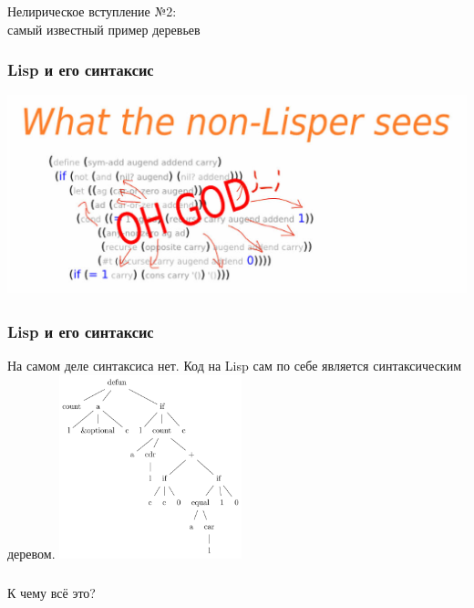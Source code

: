 \documentclass[10pt]{beamer}
\begin{document}
    \begin{frame}[c]
        \frametitle{}
        \LARGE\begin{center}
            {\color{darkred} Нелирическое вступление №2:\\самый известный пример деревьев}
        \end{center}
    \end{frame}

    \begin{frame}
        \frametitle{Lisp и его синтаксис}
        \begin{block}{}\includegraphics[width=\textwidth]{assets/lispomg.jpg}\end{block}
    \end{frame}

    \begin{frame}
        \frametitle{Lisp и его синтаксис}
        \begin{multicols}{2}
            На самом деле синтаксиса нет. Код на Lisp сам по себе является синтаксическим деревом.
            {\scriptsize }
            \includegraphics[width=150pt]{assets/lisptree.png}
        \end{multicols}
    \end{frame}

    \begin{frame}[c]
        \frametitle{}
        \huge\begin{center}
            {\color{darkred}К чему всё это?}
        \end{center}
    \end{frame}
\end{document}
